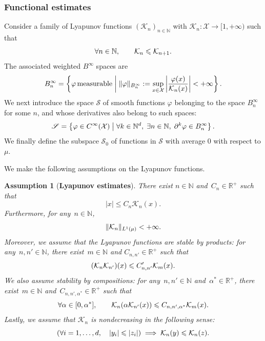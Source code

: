 \documentclass[11pt]{article}
\newcommand{\R}{\mathbb{R}}
\newcommand{\N}{\mathbb{N}}
\renewcommand{\S}{\mathscr{S}}
\renewcommand{\leq}{\leqslant}
\DeclarePairedDelimiter\norm{\lVert}{\rVert}
\DeclarePairedDelimiter\paren{\lparen}{\rparen}
\newtheorem{assumption}{Assumption}
\theoremstyle{definition}
\begin{document}
\subsubsection{Functional estimates}
\label{subsubsec:lyapunov_setting}
Consider a family of Lyapunov functions $(\mathcal{K}_n)_{n\in\N}$ with $\mathcal{K}_n \colon \mathcal{X} \to [1,+\infty)$ such that
\begin{equation}
\notag
	\forall n\in\N, \qquad \mathcal{K}_n \leq \mathcal{K}_{n+1}.
\end{equation}
The associated weighted $B^\infty$ spaces are
\begin{equation}
\notag
    B_n^\infty = \left\{\varphi \, \rm{measurable} \; \middle| \; \|\varphi\|_{B_n^\infty} := \sup _{x \in \mathcal{X}}\left| \frac{\varphi(x)}{\mathcal{K}_n(x)} \right| < +\infty\right\}.
\end{equation}
We next introduce the space $\S$ of smooth functions $\varphi$ belonging to the space $B^\infty_n$ for some $n$, and whose derivatives also belong to such spaces:
\begin{equation}
\notag
    \S = \left\{\varphi \in C^\infty(\mathcal{X}) \; \middle| \; \forall k \in \mathbb{N}^d, \; \exists n \in \mathbb{N}, \; \partial^k \varphi \in B_n^\infty\right\}.
\end{equation}
We finally define the subspace $\S_0$ of functions in $\S$ with average 0 with respect to $\mu$.

We make the following assumptions on the Lyapunov functions.

\begin{assumption}[{\bf Lyapunov estimates}]
\label{as:lyapunov}
There exist $n\in\N$ and~$C_n\in\R^+$ such that
\begin{equation}
	|x| \leq C_n\mathcal{K}_n(x).
	\label{eq:lyap_identity}
\end{equation}
Furthermore, for any~$n\in\N$,
\begin{equation}
	\norm{\mathcal{K}_n}_{L^1(\mu)} < +\infty.
	\label{eq:lyap_L1}
\end{equation}
Moreover, we assume that the Lyapunov functions are stable by products: for any~$n,n'\in\N$, there exist~$m\in\N$ and $C_{n,n'}\in\R^+$ such that
\begin{equation}
	\paren*{\mathcal{K}_n\mathcal{K}_{n'}}(x) \leq C'_{n,n'}\mathcal{K}_m(x).
	\label{eq:lyap_prod}
\end{equation}
We also assume stability by compositions: for any~$n,n'\in\N$ and~$\alpha^*\in\R^+$, there exist~$m\in\N$ and~$C_{n,n',\alpha^*}\in\R^+$ such that
\begin{equation}
\notag
	\forall\alpha \in [0,\alpha^*], \qquad \mathcal{K}_n(\alpha\mathcal{K}_{n'}(x)) \leq C_{n,n',\alpha^*}\mathcal{K}_m(x).
	\label{eq:lyap_comp}
\end{equation}
Lastly, we assume that $\mathcal{K}_n$ is nondecreasing in the following sense:
\begin{equation}
	\paren*{\forall i = 1,\dotsc,d, \quad |y_i| \leq |z_i|} \implies \mathcal{K}_n(y) \leq \mathcal{K}_n(z).
\end{equation}
\end{assumption}
\end{document}
